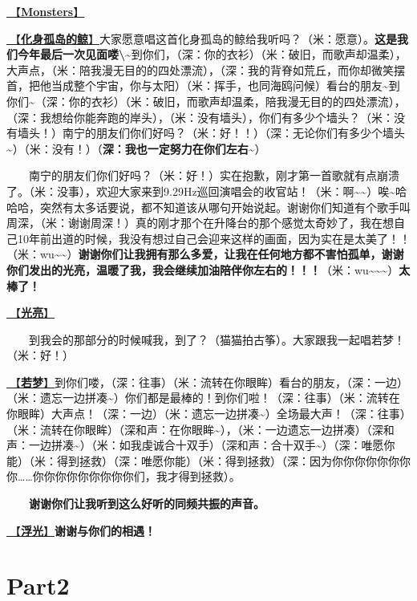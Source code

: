 \documentclass[]{ctexbook}
\begin{document}
\hyperref[Monsters]{🎵【\textbf{Monsters}】}

\hyperref[hua-shen-gu-dao-de-jing]{🎵【\textbf{化身孤岛的鲸}】}大家愿意唱这首化身孤岛的鲸给我听吗？（米：愿意）。\textbf{这是我们今年最后一次见面喽\textbackslash\textasciitilde{}}到你们，（深：你的衣衫）（米：破旧，而歌声却温柔），大声点，（米：陪我漫无目的的四处漂流），（深：我的背脊如荒丘，而你却微笑摆首，把他当成整个宇宙，你与太阳）（米：挥手，也同海鸥问候）看台的朋友\textasciitilde 到你们\textasciitilde（深：你的衣衫）（米：破旧，而歌声却温柔，陪我漫无目的的四处漂流），（深：我想给你能奔跑的岸头），（米：没有墙头），你们有多少个墙头？（米：没有墙头！）南宁的朋友们你们好吗？（米：好！！）（深：无论你们有多少个墙头\textasciitilde）（米：没有！）（\textbf{深：我也一定努力在你们左右\textasciitilde{}}）

  南宁的朋友们你们好吗？（米：好！）实在抱歉，刚才第一首歌就有点崩溃了。（米：没事），欢迎大家来到9.29Hz巡回演唱会的收官站！（米：啊\textasciitilde\textasciitilde）唉\textasciitilde 哈哈哈，突然有太多话要说，都不知道该从哪句开始说起。谢谢你们知道有个歌手叫周深，（米：谢谢周深！）真的刚才那个在升降台的那个感觉太奇妙了，我在想自己10年前出道的时候，我没有想过自己会迎来这样的画面，因为实在是太美了！！（米：wu\textasciitilde\textasciitilde）\textbf{谢谢你们让我拥有那么多爱，让我在任何地方都不害怕孤单，谢谢你们发出的光亮，温暖了我，我会继续加油陪伴你左右的！！！}（米：wu\textasciitilde\textasciitilde\textasciitilde）\textbf{太棒了！}

\hyperref[silver-linings]{🎵【\textbf{光亮}】}

  到我会的那部分的时候喊我，到了？（猫猫拍古筝）。大家跟我一起唱若梦！（米：好！）

\hyperref[ruomeng]{🎵【\textbf{若梦}】}到你们喽，（深：往事）（米：流转在你眼眸）看台的朋友，（深：一边）（米：遗忘一边拼凑\textasciitilde）你们都是最棒的！到你们啦！（深：往事）（米：流转在你眼眸）大声点！（深：一边）（米：遗忘一边拼凑\textasciitilde）全场最大声！（深：往事）（米：流转在你眼眸）（深和声：在你眼眸\textasciitilde），（米：一边遗忘一边拼凑）（深和声：一边拼凑\textasciitilde）（米：如我虔诚合十双手）（深和声：合十双手\textasciitilde）（深：唯愿你能）（米：得到拯救）（深：唯愿你能）（米：得到拯救）（深：因为你你你你你你你你\ldots\ldots 你你你你你你你你你们，我才得到拯救）。

  \textbf{谢谢你们让我听到这么好听的同频共振的声音。}

\hyperref[floating-light]{🎵【\textbf{浮光}】}\textbf{谢谢与你们的相遇！}

\section{Part2}\label{nanning-20241207-part2}
\end{document}
